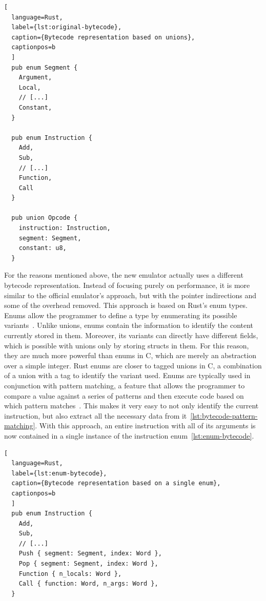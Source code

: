 \begin{lstlisting}[
  language=Rust,
  label={lst:original-bytecode},
  caption={Bytecode representation based on unions},
  captionpos=b
  ]
  pub enum Segment {
    Argument,
    Local,
    // [...]
    Constant,
  }

  pub enum Instruction {
    Add,
    Sub,
    // [...]
    Function,
    Call
  }

  pub union Opcode {
    instruction: Instruction,
    segment: Segment,
    constant: u8,
  }
\end{lstlisting}

For the reasons mentioned above, the new emulator actually uses a different bytecode representation.
Instead of focusing purely on performance, it is more similar to the official emulator's approach, but with the pointer indirections and some of the overhead removed.
This approach is based on Rust's enum types.
Enums allow the programmer to define a type by enumerating its possible variants~\cite[Chapter~6]{klabnik2019rust}.
Unlike unions, enums contain the information to identify the content currently stored in them.
Moreover, its variants can directly have different fields, which is possible with unions only by storing structs in them.
For this reason, they are much more powerful than enums in C, which are merely an abstraction over a simple integer.
Rust enums are closer to tagged unions in C, a combination of a union with a tag to identify the variant used.
Enums are typically used in conjunction with pattern matching, a feature that allows the programmer to compare a value against a series of patterns and then execute code based on which pattern matches~\cite[Chapter~6.2]{klabnik2019rust}.
This makes it very easy to not only identify the current instruction, but also extract all the necessary data from it~\ref{lst:bytecode-pattern-matching}.
With this approach, an entire instruction with all of its arguments is now contained in a single instance of the instruction enum~\ref{lst:enum-bytecode}.

\begin{lstlisting}[
  language=Rust,
  label={lst:enum-bytecode},
  caption={Bytecode representation based on a single enum},
  captionpos=b
  ]
  pub enum Instruction {
    Add,
    Sub,
    // [...]
    Push { segment: Segment, index: Word },
    Pop { segment: Segment, index: Word },
    Function { n_locals: Word },
    Call { function: Word, n_args: Word },
  }
\end{lstlisting}

